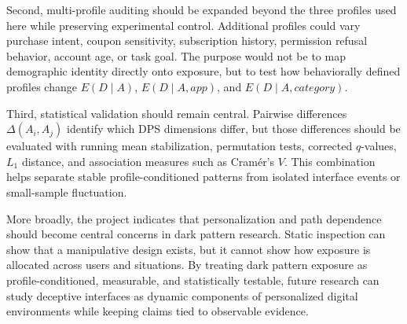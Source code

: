 Second, multi-profile auditing should be expanded beyond the three profiles used here while preserving experimental control. Additional profiles could vary purchase intent, coupon sensitivity, subscription history, permission refusal behavior, account age, or task goal. The purpose would not be to map demographic identity directly onto exposure, but to test how behaviorally defined profiles change \(E(D \mid A)\), \(E(D \mid A, app)\), and \(E(D \mid A, category)\).

Third, statistical validation should remain central. Pairwise differences \(\Delta(A_i,A_j)\) identify which DPS dimensions differ, but those differences should be evaluated with running mean stabilization, permutation tests, corrected \(q\)-values, \(L_1\) distance, and association measures such as Cramér's \(V\). This combination helps separate stable profile-conditioned patterns from isolated interface events or small-sample fluctuation.

More broadly, the project indicates that personalization and path dependence should become central concerns in dark pattern research. Static inspection can show that a manipulative design exists, but it cannot show how exposure is allocated across users and situations. By treating dark pattern exposure as profile-conditioned, measurable, and statistically testable, future research can study deceptive interfaces as dynamic components of personalized digital environments while keeping claims tied to observable evidence.
